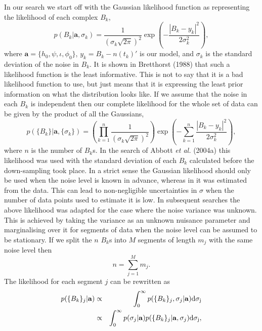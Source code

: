 In our search we start off with the Gaussian likelihood function as representing the likelihood of
each complex $B_k$,
\begin{equation}
p(B_k| \mathbf{a},\sigma_k) = \frac{1}{(\sigma_k\sqrt{2\pi})^2}\exp\left(-\frac{| B_k -
y_k |^2}{2\sigma_k^2}\right),
\end{equation} 
where $\mathbf{a} = \{h_0, \psi, \iota, \phi_0\}$, $y_k = B_k - n(t_k)'$ is our model, and
$\sigma_k$ is the standard deviation of the noise in $B_k$. It is shown in Bretthorst (1988)
\cite{Bretthorst:1988} that such a likelihood function is the least informative. This is not to say
that it is a bad likelihood function to use, but just means that it is expressing the least prior
information on what the distribution looks like. If we assume that the noise in each $B_k$ is
independent then our complete likelihood for the whole set of data can be given by the product of
all the Gaussians,
\begin{equation}\label{GaussianLikelihood}
p(\{B_k\}| \mathbf{a},\{\sigma_k\})=
\left(\prod_{k=1}^n\frac{1}{(\sigma_k\sqrt{2\pi})^2}\right)\exp\left(-\sum_{k=1}^n\frac{| B_k - y_k
|^2}{2\sigma_k^2}\right),
\end{equation}
where $n$ is the number of $B_k$s. In the search of Abbott {\it et al.} (2004a) \cite{Abbott:2004}
this likelihood was used with the standard deviation of each $B_k$ calculated before the
down-sampling took place. In a strict sense the Gaussian likelihood should only be used when the
noise level is known in advance, whereas in \cite{Abbott:2004} it was estimated from the data. This
can lead to non-negligible uncertainties in $\sigma$ when the number of data points used to estimate
it is low. In subsequent searches \cite{Abbott:2005, Dupuis:2004} the above likelihood was adapted
for the case where the noise variance was unknown. This is achieved by taking the variance as an
unknown nuisance parameter and marginalising over it for segments of data when the noise level can
be assumed to be stationary. If we split the $n$ $B_k$s into $M$ segments of length $m_j$ with the
same noise level then
\begin{equation}
n = \sum_{j=1}^M m_j.
\end{equation}
The likelihood for each segment $j$ can be rewritten as
\begin{eqnarray}\label{MarginaliseNoiseLikelihood}
p(\{B_k\}_j|\mathbf{a}) & \propto & \int_0^\infty p(\{B_k\}_j,\sigma_j|\mathbf{a})\rm{d}\sigma_j
\nonumber \\
 & \propto & \int_0^\infty p(\sigma_j|\mathbf{a})p(\{B_k\}_j|\mathbf{a},\sigma_j)\rm{d}\sigma_j,
\end{eqnarray}
